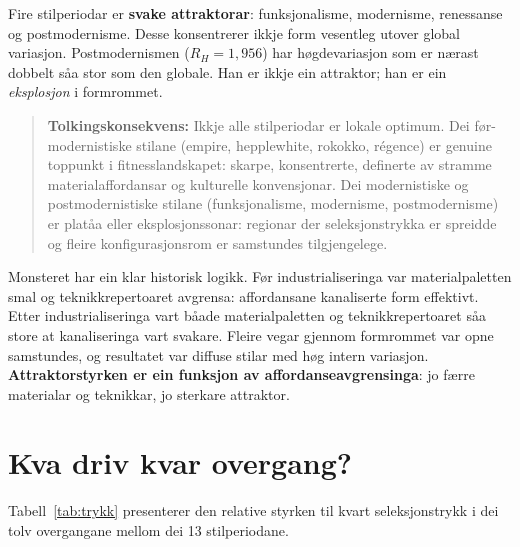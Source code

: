 \documentclass[10pt, a4paper, twocolumn]{article}
\begin{document}
Fire stilperiodar er \textbf{svake attraktorar}: funksjonalisme, modernisme, renessanse og postmodernisme. Desse konsentrerer ikkje form vesentleg utover global variasjon. Postmodernismen ($R_H = 1{,}956$) har h\o gdevariasjon som er n\ae rast dobbelt s\r{a}a stor som den globale. Han er ikkje ein attraktor; han er ein \emph{eksplosjon} i formrommet.

\begin{quote}
\textbf{Tolkingskonsekvens:} Ikkje alle stilperiodar er lokale optimum. Dei f\o r-modernistiske stilane (empire, hepplewhite, rokokko, r\'{e}gence) er genuine toppunkt i fitnesslandskapet: skarpe, konsentrerte, definerte av stramme materialaffordansar og kulturelle konvensjonar. Dei modernistiske og post\-modernistiske stilane (funksjonalisme, modernisme, postmodernisme) er plat\r{a}a eller eksplosjonssonar: regionar der seleksjonstrykka er spreidde og fleire konfigurasjonsrom er samstundes tilgjengelege.
\end{quote}

Monsteret har ein klar historisk logikk. F\o r industrialiseringa var materialpaletten smal og teknikkrepertoaret avgrensa: affordansane kanaliserte form effektivt. Etter industrialiseringa vart b\r{a}ade materialpaletten og teknikkrepertoaret s\r{a}a store at kanaliseringa vart svakare. Fleire vegar gjennom formrommet var opne samstundes, og resultatet var diffuse stilar med h\o g intern variasjon. \textbf{Attraktorstyrken er ein funksjon av affordanseavgrensinga}: jo f\ae rre materialar og teknikkar, jo sterkare attraktor.


\section{Kva driv kvar overgang?}

Tabell~\ref{tab:trykk} presenterer den relative styrken til kvart seleksjonstrykk i dei tolv overgangane mellom dei 13 stilperiodane.
\end{document}
